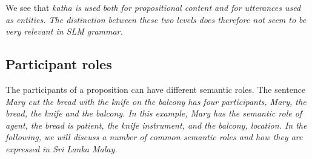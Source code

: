
We see that \em katha \em is used both for propositional content and for utterances used as entities. The distinction between these two levels does  therefore not seem to be very relevant in SLM grammar.

%
%
%

\subsection{Participant roles}\label{sec:func:Participantroles}
The participants of a proposition can have different semantic roles. The sentence \em Mary cut the bread with the knife on the balcony \em has four participants, \em Mary, the bread, the knife \em and \em the balcony\em. In this example, Mary has the semantic role of agent, the bread is patient, the knife instrument, and the balcony, location. In the following, we will discuss a number of common semantic roles and how they are expressed in Sri Lanka Malay.

